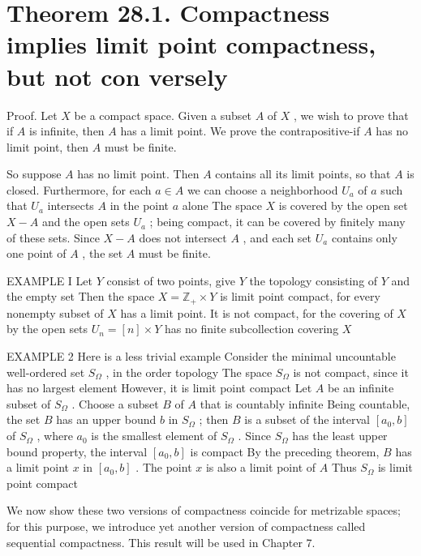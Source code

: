 \section*{Theorem 28.1. Compactness implies limit point compactness, but not con versely}

Proof. Let \(X\) be a compact space. Given a subset \(A\) of \(X\) , we wish to prove that if \(A\) is infinite, then \(A\) has a limit point. We prove the contrapositive-if \(A\) has no limit point, then \(A\) must be finite.

So suppose \(A\) has no limit point. Then \(A\) contains all its limit points, so that \(A\) is closed. Furthermore, for each \(a \in  A\) we can choose a neighborhood \({U}_{a}\) of \(a\) such that \({U}_{a}\) intersects \(A\) in the point \(a\) alone The space \(X\) is covered by the open set \(X - A\) and the open sets \({U}_{a}\) ; being compact, it can be covered by finitely many of these sets. Since \(X - A\) does not intersect \(A\) , and each set \({U}_{a}\) contains only one point of \(A\) , the set \(A\) must be finite.

EXAMPLE I Let \(Y\) consist of two points, give \(Y\) the topology consisting of \(Y\) and the empty set Then the space \(X = {\mathbb{Z}}_{ + } \times  Y\) is limit point compact, for every nonempty subset of \(X\) has a limit point. It is not compact, for the covering of \(X\) by the open sets \({U}_{n} = \left\lbrack  n\right\rbrack   \times  Y\) has no finite subcollection covering \(X\)

EXAMPLE 2 Here is a less trivial example Consider the minimal uncountable well-ordered set \({S}_{\Omega }\) , in the order topology The space \({S}_{\Omega }\) is not compact, since it has no largest element However, it is limit point compact Let \(A\) be an infinite subset of \({S}_{\Omega }\) . Choose a subset \(B\) of \(A\) that is countably infinite Being countable, the set \(B\) has an upper bound \(b\) in \({S}_{\Omega }\) ; then \(B\) is a subset of the interval \(\left\lbrack  {{a}_{0},b}\right\rbrack\) of \({S}_{\Omega }\) , where \({a}_{0}\) is the smallest element of \({S}_{\Omega }\) . Since \({S}_{\Omega }\) has the least upper bound property, the interval \(\left\lbrack  {{a}_{0},b}\right\rbrack\) is compact By the preceding theorem, \(B\) has a limit point \(x\) in \(\left\lbrack  {{a}_{0},b}\right\rbrack\) . The point \(x\) is also a limit point of \(A\) Thus \({S}_{\Omega }\) is limit point compact

We now show these two versions of compactness coincide for metrizable spaces; for this purpose, we introduce yet another version of compactness called sequential compactness. This result will be used in Chapter 7.

